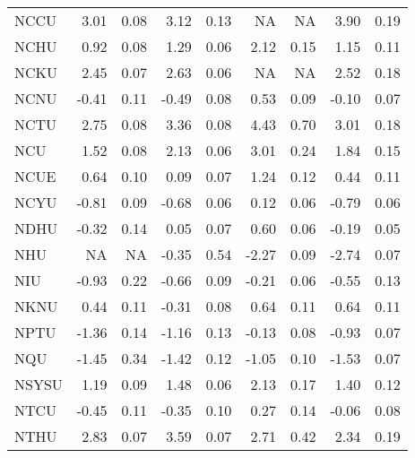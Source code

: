 \begin{longtable}[t]{lrrrrrrrr}
\hspace{1em}NCCU & 3.01 & 0.08 & 3.12 & 0.13 & NA & NA & 3.90 & 0.19\\
\hspace{1em}NCHU & 0.92 & 0.08 & 1.29 & 0.06 & 2.12 & 0.15 & 1.15 & 0.11\\
\hspace{1em}NCKU & 2.45 & 0.07 & 2.63 & 0.06 & NA & NA & 2.52 & 0.18\\
\hspace{1em}NCNU & -0.41 & 0.11 & -0.49 & 0.08 & 0.53 & 0.09 & -0.10 & 0.07\\
\hspace{1em}NCTU & 2.75 & 0.08 & 3.36 & 0.08 & 4.43 & 0.70 & 3.01 & 0.18\\
\hspace{1em}NCU & 1.52 & 0.08 & 2.13 & 0.06 & 3.01 & 0.24 & 1.84 & 0.15\\
\hspace{1em}NCUE & 0.64 & 0.10 & 0.09 & 0.07 & 1.24 & 0.12 & 0.44 & 0.11\\
\hspace{1em}NCYU & -0.81 & 0.09 & -0.68 & 0.06 & 0.12 & 0.06 & -0.79 & 0.06\\
\hspace{1em}NDHU & -0.32 & 0.14 & 0.05 & 0.07 & 0.60 & 0.06 & -0.19 & 0.05\\
\hspace{1em}NHU & NA & NA & -0.35 & 0.54 & -2.27 & 0.09 & -2.74 & 0.07\\
\hspace{1em}NIU & -0.93 & 0.22 & -0.66 & 0.09 & -0.21 & 0.06 & -0.55 & 0.13\\
\hspace{1em}NKNU & 0.44 & 0.11 & -0.31 & 0.08 & 0.64 & 0.11 & 0.64 & 0.11\\
\hspace{1em}NPTU & -1.36 & 0.14 & -1.16 & 0.13 & -0.13 & 0.08 & -0.93 & 0.07\\
\hspace{1em}NQU & -1.45 & 0.34 & -1.42 & 0.12 & -1.05 & 0.10 & -1.53 & 0.07\\
\hspace{1em}NSYSU & 1.19 & 0.09 & 1.48 & 0.06 & 2.13 & 0.17 & 1.40 & 0.12\\
\hspace{1em}NTCU & -0.45 & 0.11 & -0.35 & 0.10 & 0.27 & 0.14 & -0.06 & 0.08\\
\hspace{1em}NTHU & 2.83 & 0.07 & 3.59 & 0.07 & 2.71 & 0.42 & 2.34 & 0.19\\

\end{longtable}

